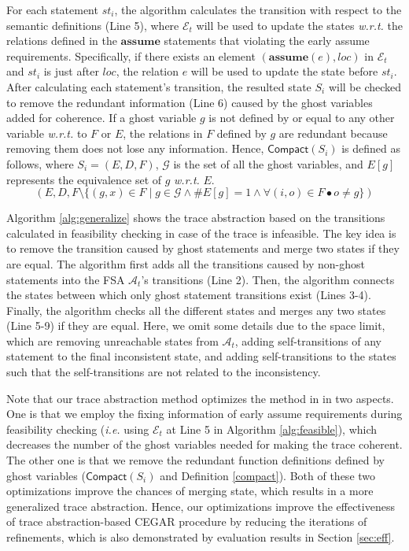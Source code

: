 For each statement $st_i$, the algorithm calculates the transition with respect to the semantic definitions \cite{fm} (Line 5), where $\mathcal{E}_t$ will be used to update the states \emph{w.r.t.} the relations defined in the $\mathbf{assume}$ statements that violating the early assume requirements. Specifically, if there exists an element $(\mathbf{assume}(e), loc)$ in $\mathcal{E}_t$ and $st_i$ is just after $loc$, the relation $e$ will be used to update the state before $st_i$. After calculating each statement's transition, the resulted state $S_i$ will be checked to remove the redundant information (Line 6) caused by the ghost variables added for coherence.
If a ghost variable $g$ is not defined by or equal to any other variable \emph{w.r.t.} to $F$ or $E$, the relations in $F$ defined by $g$ are redundant because removing them does not lose any information.
Hence, $\mathsf{Compact}(S_i)$ is defined as follows, where $S_i = (E, D, F)$, $\mathcal{G}$ is the set of all the ghost variables, and $E[g]$ represents the equivalence set of $g$ \emph{w.r.t.} $E$.
\begin{equation}\label{compact}
(E, D, F \setminus \{(g, x) \in F \mid g \in \mathcal{G} \wedge \#E[g] = 1 \wedge \forall (i, o) \in F \bullet o \neq g\})
\end{equation}

\vspace{-0.3cm}

Algorithm \ref{alg:generalize} shows the trace abstraction based on the transitions calculated in feasibility checking in case of the trace is infeasible. The key idea is to remove the transition caused by ghost statements and merge two states if they are equal. The algorithm first adds all the transitions caused by non-ghost statements into the FSA $\mathcal{A}_t$'s transitions (Line 2). Then, the algorithm connects the states between which only ghost statement transitions exist (Lines 3-4). Finally, the algorithm checks all the different states and merges any two states (Line 5-9) if they are equal. Here, we omit some details due to the space limit, which are removing unreachable states from $\mathcal{A}_t$, adding self-transitions of any statement to the final inconsistent state, and adding self-transitions to the states such that the self-transitions are not related to the inconsistency.

Note that our trace abstraction method optimizes the method in \cite{fm} in two aspects. One is that we employ the fixing information of early assume requirements during feasibility checking (\emph{i.e.} using $\mathcal{E}_t$ at Line 5 in Algorithm \ref{alg:feasible}), which decreases the number of the ghost variables needed for making the trace coherent. The other one is that we remove the redundant function definitions defined by ghost variables ($\mathsf{Compact}(S_i)$ and Definition \ref{compact}). Both of these two optimizations improve the chances of merging state, which results in a more generalized trace abstraction. Hence, our optimizations improve the effectiveness of trace abstraction-based CEGAR procedure by reducing the iterations of refinements, which is also demonstrated by evaluation results in Section \ref{sec:eff}.

